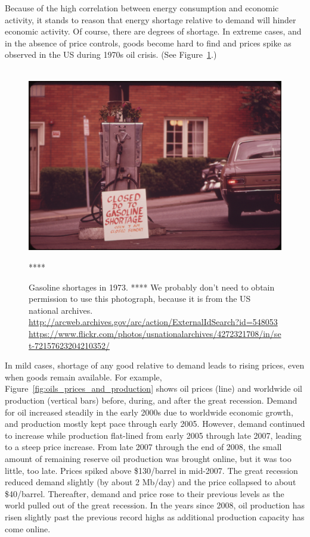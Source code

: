 Because of the high correlation between energy consumption and economic activity,
it stands to reason that energy shortage relative to demand will hinder economic activity.
Of course, there are degrees of shortage. 
In extreme cases, and in the absence of price controls,
goods become hard to find and prices spike
as observed in the US during 1970s oil crisis.
(See Figure~\ref{fig:gas_shortage}.)

\begin{figure}[!ht]
\centering\
\includegraphics[width=\linewidth]{Part_0/Chapter_Introduction/images/gas_shortage_1973.jpg}
\caption[Gasoline shortage]{Gasoline shortages in 1973.
**** We probably don't need to obtain permission to use this photograph, because
it is from the US national archives.
\url{http://arcweb.archives.gov/arc/action/ExternalIdSearch?id=548053}
\url{https://www.flickr.com/photos/usnationalarchives/4272321708/in/set-72157623204210352/}}
****
\label{fig:gas_shortage}
\end{figure}

In mild cases,
shortage of any good relative to demand leads to rising prices,
even when goods remain available.
For example,
Figure~\ref{fig:oils_prices_and_production} shows oil prices (line) and 
worldwide oil production (vertical bars) 
before, during, and after the great recession. 
Demand for oil increased steadily in the early 2000s
due to worldwide economic growth, 
and production mostly kept pace through early 2005.
However, demand continued to increase while 
production flat-lined from early 2005 through late 2007, 
leading to a steep price increase.
From late 2007 through the end of 2008, 
the small amount of remaining reserve oil production was brought online,
but it was too little, too late.
Prices spiked above \$130/barrel in mid-2007. 
The great recession reduced demand slightly (by about 2 Mb/day)
and the price collapsed to about \$40/barrel.
Thereafter, demand and price rose to their previous levels 
as the world pulled out of the great recession.
In the years since 2008, oil production has risen slightly past the previous record highs
as additional production capacity has come online.


